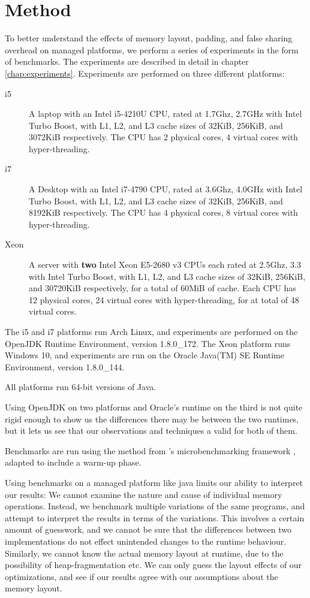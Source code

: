 \chapter{Method}
\label{chap:method}
To better understand the effects of memory layout, padding, and false sharing
overhead on managed platforms, we perform a series of experiments in the form of
benchmarks. The experiments are described in detail in chapter
\ref{chap:experiments}. Experiments are performed on three different platforms:

\begin{description}
\item [i5] A laptop with an Intel i5-4210U CPU, rated at 1.7Ghz, 2.7GHz with Intel
Turbo Boost, with L1, L2, and L3 cache sizes of 32KiB, 256KiB, and 3072KiB
respectively. The CPU has 2 physical cores, 4 virtual cores with
hyper-threading.
\item [i7] A Desktop with an Intel i7-4790 CPU, rated at 3.6Ghz, 4.0GHz with Intel
Turbo Boost, with L1, L2, and L3 cache sizes of 32KiB, 256KiB, and 8192KiB
respectively. The CPU has 4 physical cores, 8 virtual cores with
hyper-threading.
\item [Xeon] A server with \textbf{two} Intel Xeon E5-2680 v3 CPUs each rated at
2.5Ghz, 3.3 with Intel Turbo Boost, with L1, L2, and L3 cache sizes of 32KiB,
256KiB, and 30720KiB respectively, for a total of 60MiB of cache. Each CPU has 12
physical cores, 24 virtual cores with hyper-threading, for at total of 48 virtual cores.
\end{description}

The i5 and i7 platforms run Arch Linux, and experiments are performed on the
OpenJDK Runtime Environment, version 1.8.0\_172. The Xeon platform runs Windows
10, and experiments are run on the Oracle Java(TM) SE Runtime Environment, version
1.8.0\_144.

All platforms run 64-bit versions of Java.

Using OpenJDK on two platforms and Oracle's runtime on the third is not quite
rigid enough to show us the differences there may be between the two runtimes,
but it lets us see that our observations and techniques a valid for both of
them.

Benchmarks are run using the  method from \citeauthor{microbmarks}'s
microbenchmarking framework \cite{microbmarks}, adapted to include a warm-up
phase.

Using benchmarks on a managed platform like java limits our ability to interpret
our results: We cannot examine the nature and cause of individual memory
operations. Instead, we benchmark multiple variations of the same programs, and
attempt to interpret the results in terms of the variations. This involves a
certain amount of guesswork, and we cannot be sure that the differences between
two implementations do not effect unintended changes to the runtime behaviour.
Similarly, we cannot know the actual memory layout at runtime, due to the
possibility of heap-fragmentation etc. We can only guess
the layout effects of our optimizations, and see if our results agree
with our assumptions about the memory layout.

